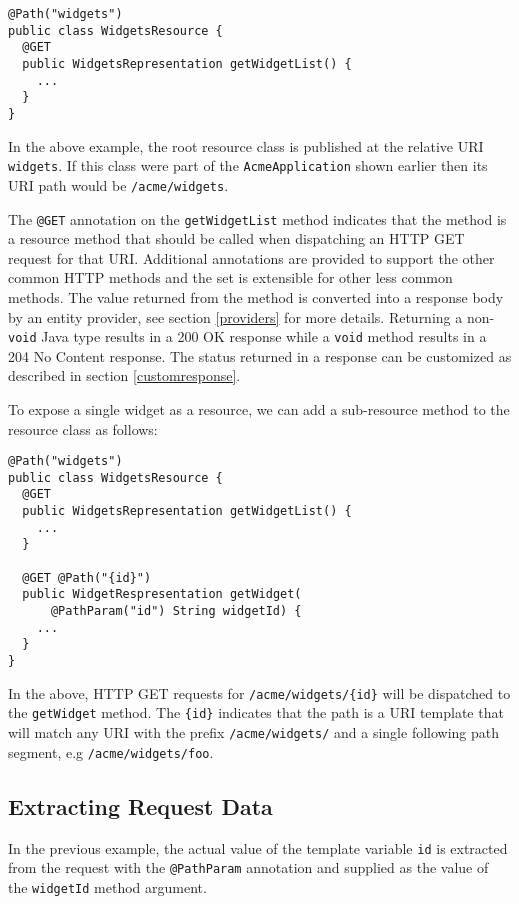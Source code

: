 \documentclass{acm_proc_article-sp}
\begin{document}
\begin{verbatim}
@Path("widgets")
public class WidgetsResource {
  @GET
  public WidgetsRepresentation getWidgetList() {
    ...
  }
}
\end{verbatim}

In the above example, the root resource class is published at the relative URI \texttt{widgets}. If this class were part of the \texttt{AcmeApplication} shown earlier then its URI path would be \texttt{/acme/widgets}.

The \texttt{@GET} annotation on the \texttt{getWidgetList} method indicates that the method is a resource method that should be called when dispatching an HTTP GET request for that URI. Additional annotations are provided to support the other common HTTP methods and the set is extensible for other less common methods. The value returned from the method is converted into a response body by an entity provider, see section \ref{providers} for more details. Returning a non-\texttt{void} Java type results in a 200 OK response while a \texttt{void} method results in a 204 No Content response. The status returned in a response can be customized as described in section \ref{customresponse}.

To expose a single widget as a resource, we can add a sub-resource method to the resource class as follows:

\begin{verbatim}
@Path("widgets")
public class WidgetsResource {
  @GET
  public WidgetsRepresentation getWidgetList() {
    ...
  }
  
  @GET @Path("{id}")
  public WidgetRespresentation getWidget(
      @PathParam("id") String widgetId) {
    ...
  }
}
\end{verbatim}

In the above, HTTP GET requests for \texttt{/acme/widgets/\{id\}} will be dispatched to the \texttt{getWidget} method. The \texttt{\{id\}} indicates that the path is a URI template that will match any URI with the prefix \texttt{/acme/widgets/} and a single following path segment, e.g \texttt{/acme/widgets/foo}.

\subsection{Extracting Request Data}

In the previous example, the actual value of the template variable \texttt{id} is extracted from the request with the \texttt{@Path\-Param} annotation and supplied as the value of the \texttt{widgetId} method argument.
\end{document}
